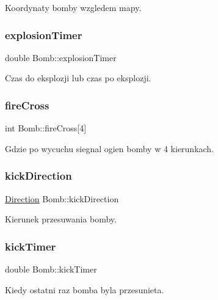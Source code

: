 Koordynaty bomby wzgledem mapy. \mbox{\label{struct_bomb_abaeef5c4cd2e2e25688ba625fe13bcc3}} 
\subsubsection{\texorpdfstring{explosion\+Timer}{explosionTimer}}
{\footnotesize\ttfamily double Bomb\+::explosion\+Timer}

Czas do eksplozji lub czas po eksplozji. \mbox{\label{struct_bomb_ae1bf7a018e0fb6b751320e41e139b0d0}} 
\subsubsection{\texorpdfstring{fire\+Cross}{fireCross}}
{\footnotesize\ttfamily int Bomb\+::fire\+Cross\mbox{[}4\mbox{]}}

Gdzie po wycuchu siegnal ogien bomby w 4 kierunkach. \mbox{\label{struct_bomb_a0bf8b6ceb32adcee6dad5b4f32605ce2}} 
\subsubsection{\texorpdfstring{kick\+Direction}{kickDirection}}
{\footnotesize\ttfamily \mbox{\hyperlink{enums_structs_macros_8h_a224b9163917ac32fc95a60d8c1eec3aa}{Direction}} Bomb\+::kick\+Direction}

Kierunek przesuwania bomby. \mbox{\label{struct_bomb_aa2ac1f6a85cb9e141f3a8313f05091cc}} 
\subsubsection{\texorpdfstring{kick\+Timer}{kickTimer}}
{\footnotesize\ttfamily double Bomb\+::kick\+Timer}

Kiedy ostatni raz bomba byla przesunieta. \mbox{\label{struct_bomb_a62a917b182cdb7bfcb3238b8a3b9eb79}} 
